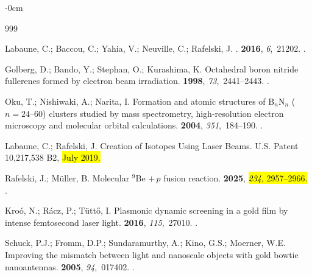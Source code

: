 \documentclass[particles,article,accept,pdftex,moreauthors]{Definitions/mdpi}
\begin{document}
\begin{adjustwidth}{-\extralength}{0cm}
\begin{thebibliography}{999}

Labaune, C.; Baccou, C.;  Yahia, V.; Neuville, C.; Rafelski, J.
.
 {\bf 2016}, {\em 6},~21202.
.

Golberg, D.; Bando, Y.;  Stephan, O.; Kurashima, K.
\newblock Octahedral boron nitride fullerenes formed by electron beam
  irradiation.
 {\bf 1998}, {\em 73},~2441--2443.
.

Oku, T.; Nishiwaki, A.;  Narita, I.
\newblock Formation and atomic structures of {B$_n$N$_n$} ($n=24$--$60$)
  clusters studied by mass spectrometry, high-resolution electron microscopy
  and molecular orbital calculations.
 {\bf 2004}, {\em 351},~184--190.
.

Labaune, C.; Rafelski, J.
\newblock Creation of Isotopes Using Laser Beams.
\newblock  U.S. Patent 10,217,538 B2,  \hl{July 2019.} %


Rafelski, J.; M{\"u}ller, B.
\newblock Molecular $^{9}$Be $+\,p$ fusion reaction.
 {\bf 2025},  \hl{\emph{234}, 2957–2966.}
.

Kro{\'o}, N.; R{\'a}cz, P.; Tüttő, I.
\newblock Plasmonic dynamic screening in a gold film by intense femtosecond
  laser light.
 {\bf 2016}, {\em 115},~27010.
.

Schuck, P.J.; Fromm, D.P.;  Sundaramurthy, A.; Kino, G.S.; Moerner, W.E.
\newblock Improving the mismatch between light and nanoscale objects with gold
  bowtie nanoantennas.
 {\bf 2005}, {\em 94},~017402.
.


\end{thebibliography}
\end{adjustwidth}
\end{document}
